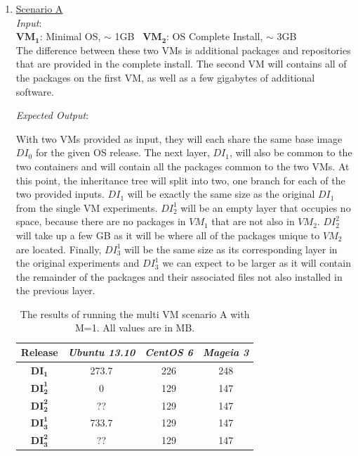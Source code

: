 \begin{enumerate}
\item \underline{Scenario A}\\
\textit{Input}:\\
$\boldsymbol{VM_1}$: Minimal OS, $\sim$ 1GB \textemdash\ $\boldsymbol{VM_2}$: OS Complete Install, $\sim$ 3GB\\

The difference between these two VMs is additional packages and repositories that are provided in the complete install. The second VM will contains all of the packages on the first VM, as well as a few gigabytes of additional software.


\textit{Expected Output}:

With two VMs provided as input, they will each share the same base image $DI_0$ for the given OS release. The next layer, $DI_1$, will also be common to the two containers and will contain all the packages common to the two VMs. At this point, the inheritance tree will split into two, one branch for each of the two provided inputs. $DI_1$ will be exactly the same size as the original $DI_1$ from the single VM experiments. $DI_2^1$ will be an empty layer that occupies no space, because there are no packages in $VM_1$ that are not also in $VM_2$. $DI_2^2$ will take up a few GB as it will be where all of the packages unique to $VM_2$ are located. Finally, $DI_3^1$ will be the same size as its corresponding layer in the original experiments and $DI_3^1$ we can expect to be larger as it will contain the remainder of the packages and their associated files not also installed in the previous layer.

\begin{table}[h]
\centering
    \begin{tabular}{| c | c | c | c|}
    \hline
    \bfseries Release & \itshape Ubuntu 13.10 & \itshape CentOS 6 & \itshape Mageia 3\\ \hline
    \bfseries $\boldsymbol{DI_1}$ & 273.7 & 226 & 248\\ \hline
    \bfseries $\boldsymbol{DI_2^1}$ & 0 & 129 & 147\\ \hline 
\bfseries $\boldsymbol{DI_2^2}$ & ?? & 129 & 147\\ \hline 
\bfseries $\boldsymbol{DI_3^1}$  & 733.7 & 129 & 147\\ \hline 
\bfseries $\boldsymbol{DI_3^2}$ & ?? & 129 & 147\\ \hline 
    \end{tabular}
\caption{The results of running the multi VM scenario A with M=1. All values are in MB.}
\label{table:multiscenarioa}
\end{table}




\end{enumerate}
